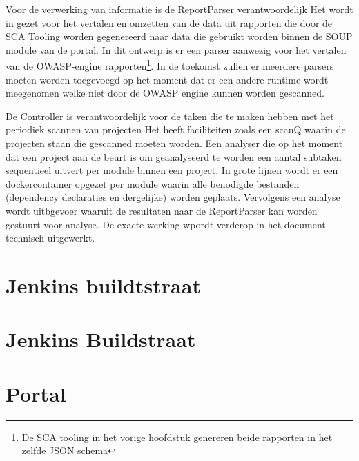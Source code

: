 Voor de verwerking van informatie is de ReportParser verantwoordelijk  Het wordt in gezet voor het vertalen en omzetten van de data uit rapporten die door de SCA Tooling worden gegenereerd naar data die gebruikt worden binnen de SOUP module van de portal. In dit ontwerp is er een parser aanwezig voor het vertalen van de OWASP-engine rapporten\footnote{De SCA tooling in het vorige hoofdstuk genereren beide rapporten in het zelfde JSON schema}. In de toekomst zullen er meerdere parsers moeten worden toegevoegd op het moment dat er een andere runtime wordt meegenomen welke niet door de OWASP engine kunnen worden gescanned.

De Controller is verantwoordelijk voor de taken die te maken hebben met het periodiek scannen van projecten Het heeft faciliteiten zoals een scanQ waarin de projecten staan die gescanned moeten worden. Een analyser die op het moment dat een project aan de beurt is om geanalyseerd te worden een aantal subtaken sequentieel uitvert per module binnen een project.
In grote lijnen wordt er een dockercontainer opgezet per module waarin alle benodigde bestanden (dependency declaraties en dergelijke) worden geplaats. Vervolgens een analyse wordt uitbgevoer waaruit de resultaten naar de ReportParser kan worden gestuurt voor analyse. De exacte werking wpordt verderop in het document technisch uitgewerkt.

\section{Jenkins buildtstraat}



\section{Jenkins Buildstraat}


\section{Portal}